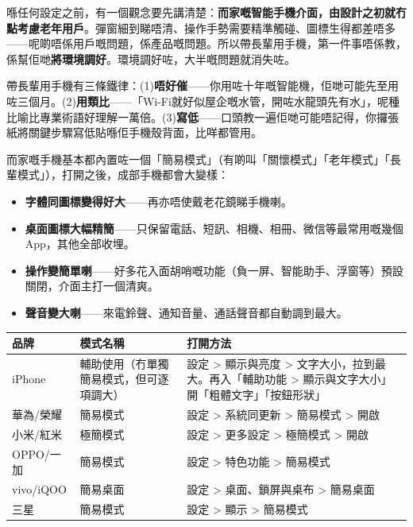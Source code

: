 


喺任何設定之前，有一個觀念要先講清楚：\textbf{而家嘅智能手機介面，由設計之初就冇點考慮老年用戶}。彈窗細到睇唔清、操作手勢需要精準觸碰、圖標生得都差唔多——呢啲唔係用戶嘅問題，係產品嘅問題。所以帶長輩用手機，第一件事唔係教，係幫佢哋\textbf{將環境調好}。環境調好咗，大半嘅問題就消失咗。

帶長輩用手機有三條鐵律：(1)\textbf{唔好催}——你用咗十年嘅智能機，佢哋可能先至用咗三個月。(2)\textbf{用類比}——「Wi-Fi就好似屋企嘅水管，開咗水龍頭先有水」，呢種比喻比專業術語好理解一萬倍。(3)\textbf{寫低}——口頭教一遍佢哋可能唔記得，你攞張紙將關鍵步驟寫低貼喺佢手機殼背面，比咩都管用。


而家嘅手機基本都內置咗一個「簡易模式」（有啲叫「關懷模式」「老年模式」「長輩模式」），打開之後，成部手機都會大變樣：

\begin{itemize}
  \item \textbf{字體同圖標變得好大}——再亦唔使戴老花鏡睇手機喇。
  \item \textbf{桌面圖標大幅精簡}——只保留電話、短訊、相機、相冊、微信等最常用嘅幾個App，其他全部收埋。
  \item \textbf{操作變簡單喇}——好多花入面胡哨嘅功能（負一屏、智能助手、浮窗等）預設關閉，介面主打一個清爽。
  \item \textbf{聲音變大喇}——來電鈴聲、通知音量、通話聲音都自動調到最大。
\end{itemize}


\begin{center}
\begin{tabularx}{\linewidth}{|X|X|X|}
\hline
\textbf{品牌} & \textbf{模式名稱} & \textbf{打開方法} \tabularnewline
\hline
iPhone & 輔助使用（冇單獨簡易模式，但可逐項調大） & 設定 > 顯示與亮度 > 文字大小，拉到最大。再入「輔助功能 > 顯示與文字大小」開「粗體文字」「按鈕形狀」 \tabularnewline
華為/榮耀 & 簡易模式 & 設定 > 系統同更新 > 簡易模式 > 開啟 \tabularnewline
小米/紅米 & 極簡模式 & 設定 > 更多設定 > 極簡模式 > 開啟 \tabularnewline
OPPO/一加 & 簡易模式 & 設定 > 特色功能 > 簡易模式 \tabularnewline
vivo/iQOO & 簡易桌面 & 設定 > 桌面、鎖屏與桌布 > 簡易桌面 \tabularnewline
三星 & 簡易模式 & 設定 > 顯示 > 簡易模式 \tabularnewline
\hline
\end{tabularx}
\end{center}

